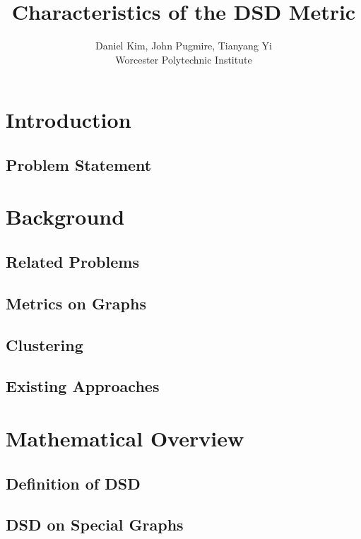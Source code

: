 \documentclass[11pt,oneside]{report}
\theoremstyle{definition}
\begin{document}
\title{Characteristics of the DSD Metric}
\author{Daniel Kim, John Pugmire, Tianyang Yi\\Worcester Polytechnic Institute\\}
\maketitle
\tableofcontents


\chapter{Introduction}

\section{Problem Statement}


\chapter{Background}

\section{Related Problems}

\section{Metrics on Graphs}

\section{Clustering}

\section{Existing Approaches}


\chapter{Mathematical Overview}

\section{Definition of DSD}

\section{DSD on Special Graphs}
\end{document}
